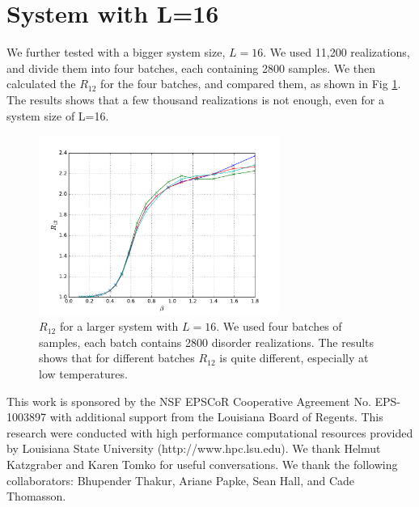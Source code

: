 \section{System with L=16}

We further tested with a bigger system size, $L=16$. We used 11,200 realizations,
and divide them into four batches, each containing 2800 samples. We then calculated
the $R_{12}$ for the four batches, and compared them, as shown in Fig \ref{fig:l16_r12}. 
The results shows that a few thousand realizations is not enough, even for a 
system size of L=16. 


\begin{figure}[ht]
  \centering
  \includegraphics[width=0.7\textwidth]{img/l16_r12.pdf}
  \caption{$R_{12}$ for a larger system with $L=16$. We used four batches of samples,
each batch contains 2800 disorder realizations. The results shows that for
different batches $R_{12}$ is quite different, especially at low temperatures.
}
\label{fig:l16_r12}
\end{figure}


This work is sponsored by the NSF EPSCoR Cooperative Agreement No. EPS-1003897 with additional support 
from the Louisiana Board of Regents. This research were conducted with high 
performance computational resources provided by 
Louisiana State University (http://www.hpc.lsu.edu). We thank Helmut Katzgraber and Karen 
Tomko for useful conversations. We thank the following collaborators: Bhupender Thakur, Ariane Papke, Sean Hall, and Cade Thomasson. 


